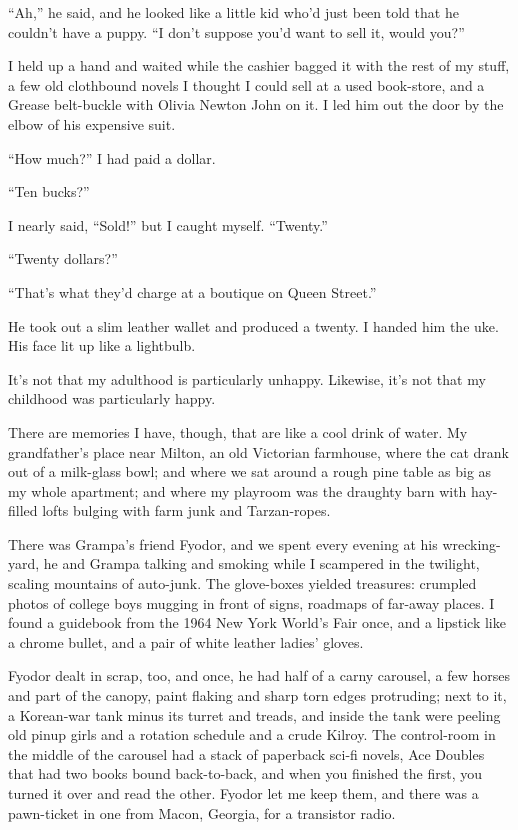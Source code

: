 ``Ah,'' he said, and he looked like a little kid who'd just been
told that he couldn't have a puppy.
``I don't suppose you'd want to sell it, would you?''

I held up a hand and waited while the cashier bagged it with the
rest of my stuff, a few old clothbound novels I thought I could
sell at a used book-store, and a Grease belt-buckle with Olivia
Newton John on it. I led him out the door by the elbow of his
expensive suit.

``How much?'' I had paid a dollar.

``Ten bucks?''

I nearly said, ``Sold!'' but I caught myself. ``Twenty.''

``Twenty dollars?''

``That's what they'd charge at a boutique on Queen Street.''

He took out a slim leather wallet and produced a twenty. I handed
him the uke. His face lit up like a lightbulb.

\tb

It's not that my adulthood is particularly unhappy. Likewise, it's
not that my childhood was particularly happy.

There are memories I have, though, that are like a cool drink of
water. My grandfather's place near Milton, an old Victorian
farmhouse, where the cat drank out of a milk-glass bowl; and where
we sat around a rough pine table as big as my whole apartment; and
where my playroom was the draughty barn with hay-filled lofts
bulging with farm junk and Tarzan-ropes.

There was Grampa's friend Fyodor, and we spent every evening at his
wrecking-yard, he and Grampa talking and smoking while I scampered
in the twilight, scaling mountains of auto-junk. The glove-boxes
yielded treasures: crumpled photos of college boys mugging in front
of signs, roadmaps of far-away places. I found a guidebook from the
1964 New York World's Fair once, and a lipstick like a chrome
bullet, and a pair of white leather ladies' gloves.

Fyodor dealt in scrap, too, and once, he had half of a carny
carousel, a few horses and part of the canopy, paint flaking and
sharp torn edges protruding; next to it, a Korean-war tank minus
its turret and treads, and inside the tank were peeling old pinup
girls and a rotation schedule and a crude Kilroy. The control-room
in the middle of the carousel had a stack of paperback sci-fi
novels, Ace Doubles that had two books bound back-to-back, and when
you finished the first, you turned it over and read the other.
Fyodor let me keep them, and there was a pawn-ticket in one from
Macon, Georgia, for a transistor radio.

